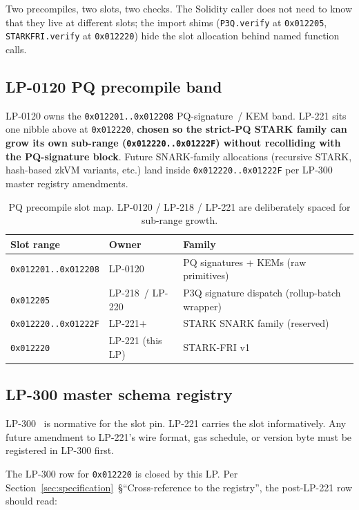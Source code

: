 Two precompiles, two slots, two checks. The Solidity caller does
not need to know that they live at different slots; the import
shims (\texttt{P3Q.verify} at \texttt{0x012205}, \texttt{STARKFRI.verify}
at \texttt{0x012220}) hide the slot allocation behind named
function calls.

\subsection{LP-0120 PQ precompile band}

LP-0120 owns the \texttt{0x012201..0x012208} PQ-signature~/ KEM
band. LP-221 sits one nibble above at \texttt{0x012220},
\textbf{chosen so the strict-PQ STARK family can grow its own
sub-range (\texttt{0x012220..0x01222F}) without recolliding with
the PQ-signature block}. Future SNARK-family allocations
(recursive STARK, hash-based zkVM variants, etc.) land inside
\texttt{0x012220..0x01222F} per LP-300 master registry amendments.

\begin{table}[h]
\centering
\small
\begin{tabular}{@{}lll@{}}
\toprule
\textbf{Slot range} & \textbf{Owner} & \textbf{Family} \\
\midrule
\texttt{0x012201..0x012208} & LP-0120 & PQ signatures + KEMs (raw primitives) \\
\texttt{0x012205}           & LP-218~/ LP-220 & P3Q signature dispatch (rollup-batch wrapper) \\
\texttt{0x012220..0x01222F} & LP-221$+$ & STARK SNARK family (reserved) \\
\texttt{0x012220}           & LP-221 (this LP) & STARK-FRI v1 \\
\bottomrule
\end{tabular}
\caption{PQ precompile slot map. LP-0120 / LP-218 / LP-221 are
deliberately spaced for sub-range growth.}
\label{tab:slot-map}
\end{table}

\subsection{LP-300 master schema registry}

LP-300~\cite{lp300} is normative for the slot pin. LP-221 carries
the slot informatively. Any future amendment to LP-221's wire
format, gas schedule, or version byte must be registered in
LP-300 first.

The LP-300 row for \texttt{0x012220} is closed by this LP. Per
Section~\ref{sec:specification}~\S``Cross-reference to the
registry'', the post-LP-221 row should read:

